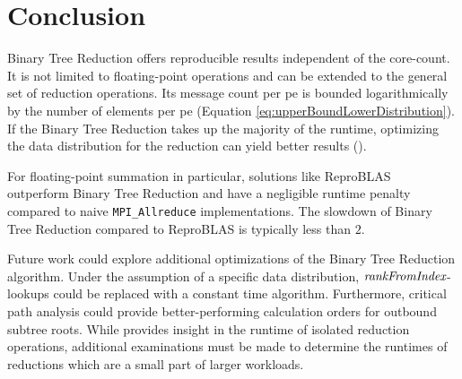 
\chapter{Conclusion}
\label{ch:Conclusion}

Binary Tree Reduction offers reproducible results independent of the core-count.
It is not limited to floating-point operations and can be extended to the general set of reduction operations.
Its message count per \gls{pe} is bounded logarithmically by the number of elements per \gls{pe} (Equation \ref{eq:upperBoundLowerDistribution}).
If the Binary Tree Reduction takes up the majority of the runtime, optimizing the data distribution for the reduction can yield better results ().

For floating-point summation in particular, solutions like ReproBLAS~\cite{ahrens_algorithms_2020} outperform Binary Tree Reduction and have a negligible runtime penalty compared to naive \texttt{MPI\_Allreduce} implementations.
The slowdown of Binary Tree Reduction compared to ReproBLAS is typically less than $2$.

Future work could explore additional optimizations of the Binary Tree Reduction algorithm.
Under the assumption of a specific data distribution, $\textit{rankFromIndex}$-lookups could be replaced with a constant time algorithm.
Furthermore, critical path analysis could provide better-performing calculation orders for outbound subtree roots.
While  provides insight in the runtime of isolated reduction operations, additional examinations must be made to determine the runtimes of reductions which are a small part of larger workloads.